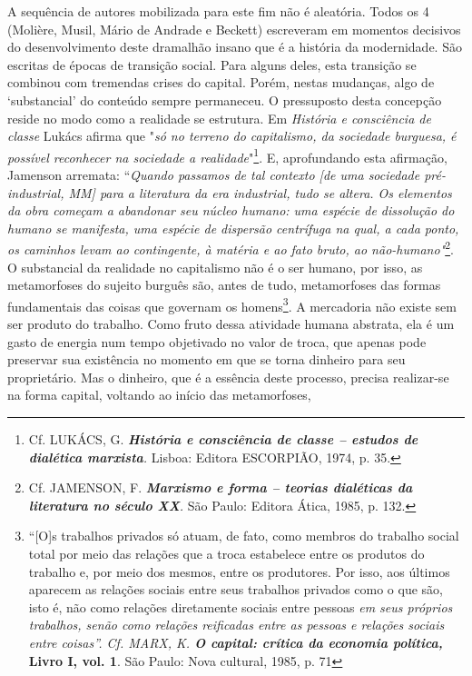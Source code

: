 A sequência de autores mobilizada para este fim não é aleatória. Todos
os 4 (Molière, Musil, Mário de Andrade e Beckett) escreveram em momentos
decisivos do desenvolvimento deste dramalhão insano que é a história da
modernidade. São escritas de épocas de transição social. Para alguns
deles, esta transição se combinou com tremendas crises do capital.
Porém, nestas mudanças, algo de `substancial' do conteúdo sempre
permaneceu. O pressuposto desta concepção reside no modo como a
realidade se estrutura. Em \emph{História e consciência de classe}
Lukács afirma que "\emph{só no terreno do capitalismo, da sociedade
burguesa, é possível reconhecer na sociedade a realidade}"\footnote{Cf.
  LUKÁCS, G. \emph{\textbf{História e consciência de classe -- estudos
  de dialética marxista}.} Lisboa: Editora ESCORPIÃO, 1974, p. 35.}. E,
aprofundando esta afirmação, Jamenson arremata: ``\emph{Quando passamos
de tal contexto {[}de uma sociedade pré-industrial, MM{]} para a
literatura da era industrial, tudo se altera. Os elementos da obra
começam a abandonar seu núcleo humano: uma espécie de dissolução do
humano se manifesta, uma espécie de dispersão centrífuga na qual, a cada
ponto, os caminhos levam ao contingente, à matéria e ao fato bruto, ao
não-humano"}\footnote{Cf. JAMENSON, F. \emph{\textbf{Marxismo e forma --
  teorias dialéticas da literatura no século XX}.} São Paulo: Editora
  Ática, 1985, p. 132.}. O substancial da realidade no capitalismo não é
o ser humano, por isso, as metamorfoses do sujeito burguês são, antes de
tudo, metamorfoses das formas fundamentais das coisas que governam os
homens\footnote{``{[}O{]}s trabalhos privados só atuam, de fato, como
  membros do trabalho social total por meio das relações que a troca
  estabelece entre os produtos do trabalho e, por meio dos mesmos, entre
  os produtores. Por isso, aos últimos aparecem as relações sociais
  entre seus trabalhos privados como o que são, isto é, não como
  relações diretamente sociais entre pessoas \emph{em seus próprios
  trabalhos, senão como relações reificadas entre as pessoas e relações
  sociais entre coisas''. Cf. MARX, K. \textbf{O capital: crítica da
  economia política, }}\textbf{Livro I, vol. 1}. São Paulo: Nova
  cultural, 1985, p. 71}. A mercadoria não existe sem ser produto do
trabalho. Como fruto dessa atividade humana abstrata, ela é um gasto de
energia num tempo objetivado no valor de troca, que apenas pode
preservar sua existência no momento em que se torna dinheiro para seu
proprietário. Mas o dinheiro, que é a essência deste processo, precisa
realizar-se na forma capital, voltando ao início das metamorfoses,
